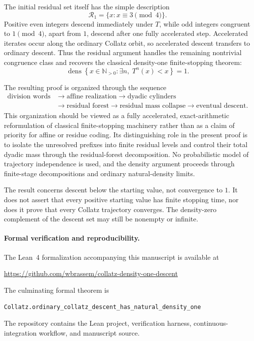 \documentclass[12pt, oneside]{article}
\numberwithin{equation}{section}
\theoremstyle{definition}
\theoremstyle{plain}
\theoremstyle{remark}
\begin{document}
The initial residual set itself has the simple description
\[
\mathcal R_1
=
\{x:x\equiv3\pmod4\}.
\]
Positive even integers descend immediately under \(T\), while odd integers
congruent to \(1\pmod4\), apart from \(1\), descend after one fully
accelerated step. Accelerated iterates occur along the ordinary Collatz
orbit, so accelerated descent transfers to ordinary descent. Thus the
residual argument handles the remaining nontrivial congruence class and
recovers the classical density-one finite-stopping theorem:
\[
\operatorname{dens}
\left\{
x\in\mathbb N_{>0}:
\exists n,\;T^n(x)<x
\right\}
=
1.
\]

The resulting proof is organized through the sequence
\[
\begin{aligned}
\text{division words}
&\longrightarrow
\text{affine realization}
\longrightarrow
\text{dyadic cylinders}
\\
&\longrightarrow
\text{residual forest}
\longrightarrow
\text{residual mass collapse}
\longrightarrow
\text{eventual descent}.
\end{aligned}
\]
This organization should be viewed as a fully accelerated, exact-arithmetic
reformulation of classical finite-stopping machinery rather than as a claim
of priority for affine or residue coding. Its distinguishing role in the
present proof is to isolate the unresolved prefixes into finite residual
levels and control their total dyadic mass through the residual-forest
decomposition. No probabilistic model of trajectory independence is used,
and the density argument proceeds through finite-stage decompositions and
ordinary natural-density limits.

The result concerns descent below the starting value, not convergence to
\(1\). It does not assert that every positive starting value has finite
stopping time, nor does it prove that every Collatz trajectory converges.
The density-zero complement of the descent set may still be nonempty or
infinite.

\paragraph{Formal verification and reproducibility.}
The Lean~4 formalization accompanying this manuscript is available at
\begin{center}
\url{https://github.com/wbrassem/collatz-density-one-descent}
\end{center}
The culminating formal theorem is
\begin{center}
\nolinkurl{Collatz.ordinary_collatz_descent_has_natural_density_one}
\end{center}
The repository contains the Lean project, verification harness,
continuous-integration workflow, and manuscript source.
\end{document}
